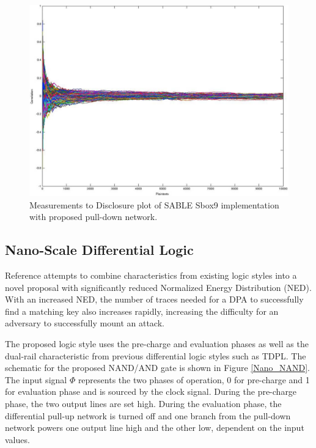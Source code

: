 \documentclass[conference, 12pt]{IEEEtran}
\newcommand{\x}{1}						%
\begin{document}
			\begin{figure}[tbp]
				\centering
				\includegraphics[width=\x\linewidth]{ReportFiles/DPDN_MTD.png}
				\caption{Measurements to Disclosure plot of SABLE Sbox9 implementation with proposed pull-down network.\cite{b5}}
				\label{DPDN_MTD}
			\end{figure}

		\subsection{Nano-Scale Differential Logic}
			Reference \cite{b6} attempts to combine characteristics from existing logic styles into a novel proposal with significantly reduced Normalized Energy Distribution (NED). With an increased NED, the number of traces needed for a DPA to successfully find a matching key also increases rapidly, increasing the difficulty for an adversary to successfully mount an attack.

			The proposed logic style uses the pre-charge and evaluation phases as well as the dual-rail characteristic from previous differential logic styles such as TDPL. The schematic for the proposed NAND/AND gate is shown in Figure \ref{Nano_NAND}. The input signal $\Phi$ represents the two phases of operation, 0 for pre-charge and 1 for evaluation phase and is sourced by the clock signal. During the pre-charge phase, the two output lines are set high. During the evaluation phase, the differential pull-up network is turned off and one branch from the pull-down network powers one output line high and the other low, dependent on the input values. 
\end{document}
